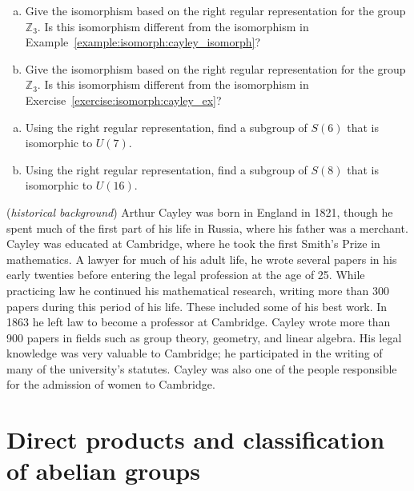 \begin{exercise}{}
\begin{enumerate}[(a)]
\item
Give the isomorphism  based on the right regular representation for the group $\mathbb{Z}_3$.  Is this isomorphism different from the isomorphism in Example~\ref{example:isomorph:cayley_isomorph}?
\item
Give the isomorphism  based on the right regular representation for the group $\mathbb{Z}_3$.  Is this isomorphism different from the isomorphism in Exercise~\ref{exercise:isomorph:cayley_ex}?
\end{enumerate}
\end{exercise}


\begin{exercise}{}
\begin{enumerate}[(a)]
\item
Using the right regular representation, find a subgroup of $S(6)$ that is isomorphic to $U(7)$.
\item
Using the right regular representation, find a subgroup of $S(8)$ that is isomorphic to $U(16)$.
\end{enumerate}
\end{exercise}

\begin{rem} (\emph{historical background})  Arthur Cayley was born in England in 1821, though he spent much of the first part of his life in Russia, where his father was a merchant.  Cayley was educated at Cambridge, where he took the first Smith's Prize in mathematics.  A lawyer for much of his adult life, he wrote several papers in his early twenties before entering the legal profession at the age of 25.  While practicing law he continued his mathematical research, writing more than 300 papers during this period of his life.  These included some of his best work.  In 1863 he left law to become a professor at Cambridge.  Cayley wrote more than 900 papers in fields such as group theory, geometry, and linear algebra. His legal knowledge was very valuable to Cambridge; he participated in the writing of many of the university's statutes.  Cayley was also one of the people responsible for the admission of women to Cambridge. 
\end{rem} 

\section{Direct products and classification of abelian groups\quad
{}}
\label{sec:Isomorphism:DirectProductsClassificationAbelianGroups}

